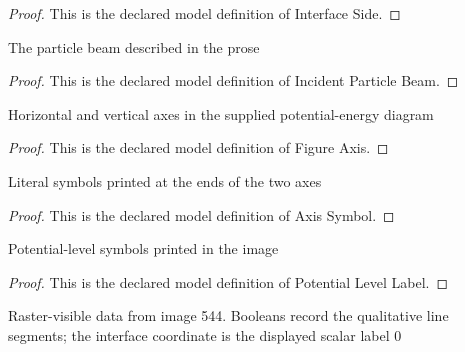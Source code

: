 \begin{proof}
  This is the declared model definition of Interface Side.
\end{proof}
\begin{definition}
  \label{def:physics:phyx-mini-0544:phyxminiproblems-problemphyxmini0544-incidentparticlebeam}
  The particle beam described in the prose
\end{definition}
\begin{proof}
  This is the declared model definition of Incident Particle Beam.
\end{proof}
\begin{definition}
  \label{def:physics:phyx-mini-0544:phyxminiproblems-problemphyxmini0544-figureaxis}
  Horizontal and vertical axes in the supplied potential-energy diagram
\end{definition}
\begin{proof}
  This is the declared model definition of Figure Axis.
\end{proof}
\begin{definition}
  \label{def:physics:phyx-mini-0544:phyxminiproblems-problemphyxmini0544-axissymbol}
  Literal symbols printed at the ends of the two axes
\end{definition}
\begin{proof}
  This is the declared model definition of Axis Symbol.
\end{proof}
\begin{definition}
  \label{def:physics:phyx-mini-0544:phyxminiproblems-problemphyxmini0544-potentiallevellabel}
  Potential-level symbols printed in the image
\end{definition}
\begin{proof}
  This is the declared model definition of Potential Level Label.
\end{proof}
\begin{definition}
  \label{def:physics:phyx-mini-0544:phyxminiproblems-problemphyxmini0544-potentialstepfigure}
  Raster-visible data from image 544. Booleans record the qualitative line segments; the interface coordinate is the displayed scalar label 0
\end{definition}
